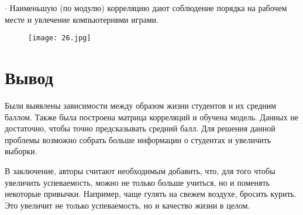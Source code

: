 \documentclass[a4paper,12pt]{article}
\begin{document}
$\cdot$ Наименьшую (по модулю) корреляцию дают соблюдение порядка на рабочем месте и увлечение компьютернвми играми.

\begin{figure}[h!]\centering
    \texttt{[image: 26.jpg]}
    \label{1_1}
\end{figure}

\section{Вывод}
Были выявлены зависимости между образом жизни студентов и их средним баллом. Также была построена матрица корреляций и обучена модель. Данных не достаточно, чтобы точно предсказывать средний балл. Для решения данной проблемы возможно собрать больше информации о студентах и увеличить выборки.

В заключение, авторы считают необходимым добавить, что, для того чтобы увеличить успеваемость, можно не только больше учиться, но и поменять некоторые привычки. Например, чаще гулять на свежем воздухе, бросить курить. Это увеличит не только успеваемость, но и качество жизни в целом.
\end{document}
